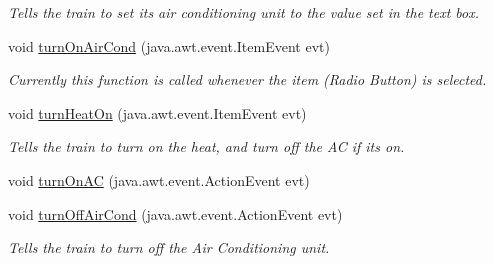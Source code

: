 \begin{DoxyCompactItemize}
\begin{DoxyCompactList}\small\item\em Tells the train to set its air conditioning unit to the value set in the text box. \end{DoxyCompactList}\item 
void \hyperlink{classTrainControllerComps_1_1TCUtilityPanel_a542e240eb03ed81a00dc1dded248b344}{turn\+On\+Air\+Cond} (java.\+awt.\+event.\+Item\+Event evt)
\begin{DoxyCompactList}\small\item\em Currently this function is called whenever the item (Radio Button) is selected. \end{DoxyCompactList}\item 
void \hyperlink{classTrainControllerComps_1_1TCUtilityPanel_abd1bf68cdc09c79e45c5e1792961ce49}{turn\+Heat\+On} (java.\+awt.\+event.\+Item\+Event evt)
\begin{DoxyCompactList}\small\item\em Tells the train to turn on the heat, and turn off the AC if it\textquotesingle{}s on. \end{DoxyCompactList}\item 
void \hyperlink{classTrainControllerComps_1_1TCUtilityPanel_a4fbd47e0835838ba1e6bf628f7cb5f5c}{turn\+On\+AC} (java.\+awt.\+event.\+Action\+Event evt)
\item 
void \hyperlink{classTrainControllerComps_1_1TCUtilityPanel_aafe79fe4b0c04b2c00e9c7bc0e3f87c1}{turn\+Off\+Air\+Cond} (java.\+awt.\+event.\+Action\+Event evt)
\begin{DoxyCompactList}\small\item\em Tells the train to turn off the Air Conditioning unit. \end{DoxyCompactList}\end{DoxyCompactItemize}
